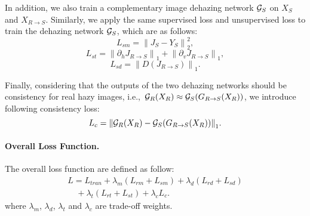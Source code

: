\documentclass[10pt,twocolumn,letterpaper]{article}
\def\ie{i.e.,~}
\begin{document}
In addition, we also train a complementary image dehazing network ${{\cal G}_S}$ on ${X_S}$ and ${X_{R \to S}}$.
Similarly, we apply the same supervised loss and unsupervised loss to train the dehazing network ${{\cal G}_S}$, which are as follows:
\begin{equation}
\label{eqn:MSE_loss1}
{L_{sm}} = \left\| {{J_S} - {Y_S}} \right\|_2^2,
\end{equation}
\begin{equation}
\label{eqn:TV_loss1}
{L_{st}} = {\left\| {{\partial _h}{J_{R \to S}}} \right\|_1} + {\left\| {{\partial _v}{J_{R \to S}}} \right\|_1},
\end{equation}
\begin{equation}
\label{eqn:DC_loss1}
{L_{sd}} = {\left\| {D({J_{R \to S}})} \right\|_1}.
\end{equation}


Finally, considering that the outputs of the two dehazing networks should be consistency for real hazy images, \ie${{\cal G}_R}({X_R}) \approx {{\cal G}_S}({G_{R \to S}}({X_R}))$, we introduce following consistency loss:
\begin{equation}
\label{eqn:consis_loss}
{L_c} = {\left\| {{{\cal G}_R}({X_R}) - {{\cal G}_S}({G_{R \to S}}({X_R}))} \right\|_1}.
\end{equation}
\paragraph{Overall Loss Function.}
The overall loss function are defined as follow:
\begin{equation}
\label{eqn:whole_loss}
\begin{array}{l}
L = {L_{tran}} + \lambda_m ({L_{rm}} + {L_{sm}}) + \lambda_d ({L_{rd}} + {L_{sd}})\\[1.8mm]
\quad + \lambda_t ({L_{rt}} + {L_{st}}) + \lambda_c {L_c}.
\end{array}
\end{equation}
where $\lambda_m$, $\lambda_d$, $\lambda_t$ and $\lambda_c$ are trade-off weights.
\end{document}
